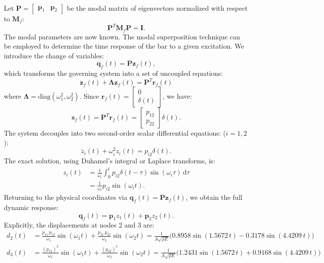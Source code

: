 \documentclass[12pt]{article}
\begin{document}
Let \( \mathbf{P} = \begin{bmatrix} \mathbf p_1 & \mathbf p_2 \end{bmatrix} \) be the modal matrix of eigenvectors normalized with respect to \( \mathbf{M}_f \):
\[
    \mathbf{P}^T \mathbf{M}_f \mathbf{P} = \mathbf{I}.
\]
The modal parameters are now known. The modal superposition technique can be employed to determine the time response of the bar to a given excitation. We introduce the change of variables:
\[
    \mathbf q_f(t) = \mathbf{P} \mathbf z_f(t),
\]
which transforms the governing system into a set of uncoupled equations:
$$\ddot{\mathbf z}_f(t) + \boldsymbol{\Lambda} \mathbf z_f(t) = \mathbf{P}^T \mathbf r_f(t)$$
where \( \boldsymbol{\Lambda} = \text{diag}(\omega_1^2, \omega_2^2) \). Since \( \mathbf r_f(t) = \begin{bmatrix} 0 \\ \delta(t) \end{bmatrix} \), we have:
\[
    \mathbf s_f(t)=\mathbf{P}^T \mathbf r_f(t) = \begin{bmatrix} p_{12} \\ p_{22} \end{bmatrix} \delta(t).
\]
The system decouples into two second-order scalar differential equations:
($i=1,2$):
$$\ddot{z}_i(t)+\omega^2_iz_i(t)  =p_{i2}\delta(t).$$
The exact solution, using Duhamel's integral or Laplace transforms, is:
\begin{align*}
    z_i(t) & =\frac{1}{\omega_{i}} \int_0^t p_{i2}\delta(t - \tau) \sin(\omega_{i} \tau) \, \mathrm{d}\tau \\
           & = \frac{1}{\omega_{i}} p_{i2} \sin(\omega_{i}t).
\end{align*}
Returning to the physical coordinates via \( \mathbf{q}_f(t) = \mathbf{P} \mathbf{z}_f(t) \), we obtain the full dynamic response:
$$ \mathbf{q}_f(t) =\mathbf{p}_{1}z_1(t)+\mathbf{p}_{2}z_2(t).$$
Explicitly, the displacements at nodes 2 and 3 are:
\begin{align*}
    d_2(t) & = \frac{p_{11} \, p_{12}}{\omega_1} \sin(\omega_1 t)+ \frac{p_{21} \, p_{22}}{\omega_2} \sin(\omega_2 t) =\frac{1}{A\sqrt{\rho E}}\big( 0.8958 \sin(1.5672\, t)
    - 0.3178 \sin(4.4209\ t)\big)                                                                                                                                            \\
    d_3(t) & = \frac{(p_{12})^2}{\omega_1} \sin(\omega_1 t) + \frac{(p_{22})^2}{\omega_2} \sin(\omega_2 t)= \frac{1}{A\sqrt{\rho E}}\big( 1.2431 \sin(1.5672\, t)
    + 0.9168 \sin(4.4209\, t)\big)
\end{align*}
\end{document}

